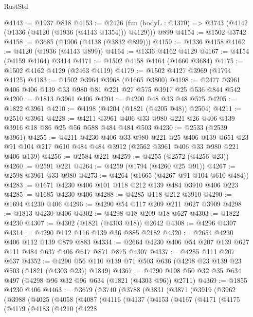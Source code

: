 \begin{lexlean}{RustStd}
\begin{coremodule}
@4143 := @1937 @818
@4153 := @2426
    (fun (bodyL : @1370) => @3743 (@4142 (@1336 (@4120 (@1936 (@4143 @1354))) @4129)))
    @899
@4154 := @1502 @3742
@4158 := @3685 (@1906 (@4138 (@3832 @899)))
@4159 := @1336 @4158
@4162 := @4120 (@1936 (@4143 @899))
@4164 := @1336 @4162 @4129
@4167 := @4154 (@4159 @4164) @3414
@4171 := @1502 @4158 @4164 (@1660 @3684)
@4175 := @1502 @4162 @4129 (@2463 @4119)
@4179 := @1502 @4127 @3969 (@1794 @4125)
@4183 := @1502 @3964 @3968 (@1665 @3800)
@4198 := @2477 @3961 @406 @406 @139 @33 @980 @81 @221 @27 @575 @3917 @25 @536 @844 @542
@4200 := @1813 @3961 @406
@4204 := @4200 @48 @33 @48 @575
@4205 := @1822 @3961
@4210 := @4198 (@4204 (@1821 (@4205 @48)) @2504)
@4211 := @2510 @3961
@4228 := @4211 @3961 @406 @33 @980 @221 @26 @406 @139 @3916 @18 @86 @25 @56 @588 @484 @484 @503
@4230 := @2533 (@2539 @3961)
@4255 := @4211
    @4230
    @406
    @33
    @980
    @221
    @25
    @406
    @139
    @651
    @23
    @91
    @104
    @217
    @610
    @484
    @484
    @3912
    (@2562 @3961 @406 @33 @980 @221 @406 @139)
@4256 := @2584 @221
@4259 := @4255 (@2572 (@4256 @23))
@4260 := @2591 @221
@4264 := @4259 (@1794 (@4260 @25 @91))
@4267 := @2598 @3961 @33 @980
@4273 := @4264 (@1665 (@4267 @91 @104 @610 @484))
@4283 := @1671 @4230 @406 @101 @118 @212 @139 @484 @3910 @406 @223
@4285 := @1685 @4230 @406
@4288 := @4285 @118 @212 @3910
@4290 := @1694 @4230 @406
@4296 := @4290 @54 @117 @209 @211 @627 @3909
@4298 := @1813 @4230 @406
@4302 := @4298 @18 @209 @18 @627
@4303 := @1822 @4230
@4307 := @4302 (@1821 (@4303 @18)) @2642
@4308 := @4296 @4307
@4314 := @4290 @112 @116 @139 @36 @885 @2182
@4320 := @2654 @4230 @406 @112 @139 @879 @883
@4334 := @2664 @4230 @406 @54 @207 @139 @627 @111 @484 @637 @406 @617 @871 @875 @4307
@4337 := @4285 @111 @207 @637
@4352 := @4290 @56 @110 @139 @71 @503 @636 (@4298 @23 @139 @23 @503 (@1821 (@4303 @23)) @1849)
@4367 := @4290 @108 @50 @32 @35 @634 @497 (@4298 @96 @32 @96 @634 (@1821 (@4303 @96)) @2711)
@4369 := @1855 @4230 @406
@4463 := @3679
    (@3740
      (@3788
        (@3831
          (@3871
            (@3919
              (@3962
                (@3988
                  (@4025
                    (@4058
                      (@4087
                        (@4116
                          (@4137
                            (@4153
                              (@4167
                                (@4171
                                  (@4175
                                    (@4179
                                      (@4183
                                        (@4210
                                          (@4228

\end{coremodule}
\end{lexlean}

